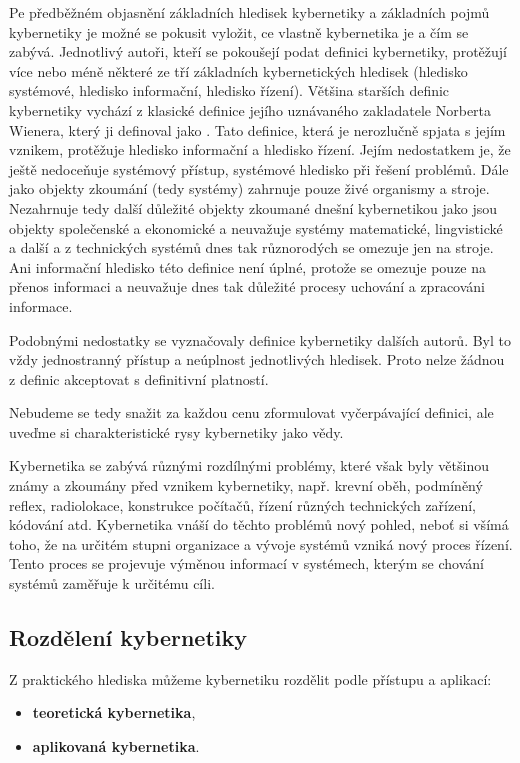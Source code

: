       Pe předběžném objasnění základních hledisek kybernetiky a základních pojmů kybernetiky je 
      možné se pokusit vyložit, ce vlastně kybernetika je a čím se zabývá. Jednotlivý autoři, kteří 
      se pokoušejí podat definici kybernetiky, protěžují více nebo méně některé ze tří základních 
      kybernetických hledisek (hledisko systémové, hledisko informační, hledisko řízení). Většina 
      starších definic kybernetiky vychází z klasické definice jejího uznávaného zakladatele 
      Norberta Wienera, který ji definoval jako . Tato definice, která je nerozlučně spjata s jejím vznikem, protěžuje hledisko 
      informační a hledisko řízení. Jejím nedostatkem je, že ještě nedoceňuje systémový přístup, 
      systémové hledisko při řešení problémů. Dále jako objekty zkoumání (tedy systémy) zahrnuje 
      pouze živé organismy a stroje. Nezahrnuje tedy další důležité objekty zkoumané dnešní 
      kybernetikou jako jsou objekty společenské a ekonomické a neuvažuje systémy matematické, 
      lingvistické a další a z technických systémů dnes tak různorodých se omezuje jen na stroje. 
      Ani informační hledisko této definice není úplné, protože se omezuje pouze na přenos 
      informaci a neuvažuje dnes tak důležité procesy uchování a zpracováni informace.
      
      Podobnými nedostatky se vyznačovaly definice kybernetiky dalších autorů. Byl to vždy 
      jednostranný přístup a neúplnost jednotlivých hledisek. Proto nelze žádnou z definic 
      akceptovat s definitivní platností.
      
      Nebudeme se tedy snažit za každou cenu zformulovat vyčerpávající definici, ale uveďme si 
      charakteristické rysy kybernetiky jako vědy.
      
      Kybernetika se zabývá různými rozdílnými problémy, které však byly většinou známy a zkoumány 
      před vznikem kybernetiky, např. krevní oběh, podmíněný reflex, radiolokace, konstrukce 
      počítačů, řízení různých technických zařízení, kódování atd. Kybernetika vnáší do těchto 
      problémů nový pohled, neboť si všímá toho, že na určitém stupni organizace a vývoje systémů 
      vzniká nový proces řízení. Tento proces se projevuje výměnou informací v systémech, kterým se 
      chování systémů zaměřuje k určitému cíli.
      
    \subsection{Rozdělení kybernetiky}
      Z praktického hlediska můžeme kybernetiku rozdělit podle přístupu a aplikací:
      \begin{itemize}[noitemsep]
        \item \textbf{teoretická kybernetika},
        \item \textbf{aplikovaná kybernetika}.
      \end{itemize}

